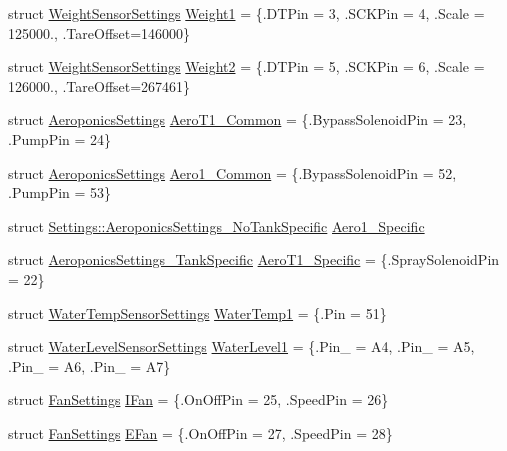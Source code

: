 \begin{DoxyCompactItemize}
\item 
struct \hyperlink{struct_settings_1_1_weight_sensor_settings}{Weight\+Sensor\+Settings} \hyperlink{struct_settings_a04ff80018a76e8e43ec93b400fdd5175}{Weight1} = \{.D\+T\+Pin = 3, .S\+C\+K\+Pin = 4, .Scale = 125000., .Tare\+Offset=146000\}
\item 
struct \hyperlink{struct_settings_1_1_weight_sensor_settings}{Weight\+Sensor\+Settings} \hyperlink{struct_settings_a2b696b80c3d9680c83b351ecd962299c}{Weight2} = \{.D\+T\+Pin = 5, .S\+C\+K\+Pin = 6, .Scale = 126000., .Tare\+Offset=267461\}
\item 
struct \hyperlink{struct_settings_1_1_aeroponics_settings}{Aeroponics\+Settings} \hyperlink{struct_settings_a6ec59b1aee19add68b8724ce686a8a77}{Aero\+T1\+\_\+\+Common} = \{.Bypass\+Solenoid\+Pin = 23, .Pump\+Pin = 24\}
\item 
struct \hyperlink{struct_settings_1_1_aeroponics_settings}{Aeroponics\+Settings} \hyperlink{struct_settings_ad27589745cefc2482110c14d378e6581}{Aero1\+\_\+\+Common} = \{.Bypass\+Solenoid\+Pin = 52, .Pump\+Pin = 53\}
\item 
struct \hyperlink{struct_settings_1_1_aeroponics_settings___no_tank_specific}{Settings\+::\+Aeroponics\+Settings\+\_\+\+No\+Tank\+Specific} \hyperlink{struct_settings_a28c68e733956792c889a66905f09480c}{Aero1\+\_\+\+Specific}
\item 
struct \hyperlink{struct_settings_1_1_aeroponics_settings___tank_specific}{Aeroponics\+Settings\+\_\+\+Tank\+Specific} \hyperlink{struct_settings_ab6250c7f010ce991a18f7fc4b23bf078}{Aero\+T1\+\_\+\+Specific} = \{.Spray\+Solenoid\+Pin = 22\}
\item 
struct \hyperlink{struct_settings_1_1_water_temp_sensor_settings}{Water\+Temp\+Sensor\+Settings} \hyperlink{struct_settings_a28b69b8736968faf69454ce61081abf0}{Water\+Temp1} = \{.Pin = 51\}
\item 
struct \hyperlink{struct_settings_1_1_water_level_sensor_settings}{Water\+Level\+Sensor\+Settings} \hyperlink{struct_settings_afe30a825758d27e4c22a3ebcdb662d2f}{Water\+Level1} = \{.Pin\+\_ = A4, .Pin\+\_ = A5, .Pin\+\_ = A6, .Pin\+\_ = A7\}
\item 
struct \hyperlink{struct_settings_1_1_fan_settings}{Fan\+Settings} \hyperlink{struct_settings_ab4e978c3bd46bc349e83231c51609ae3}{I\+Fan} = \{.On\+Off\+Pin = 25, .Speed\+Pin = 26\}
\item 
struct \hyperlink{struct_settings_1_1_fan_settings}{Fan\+Settings} \hyperlink{struct_settings_a418062c7b97898da50aa00f1c435580b}{E\+Fan} = \{.On\+Off\+Pin = 27, .Speed\+Pin = 28\}

\end{DoxyCompactItemize}
